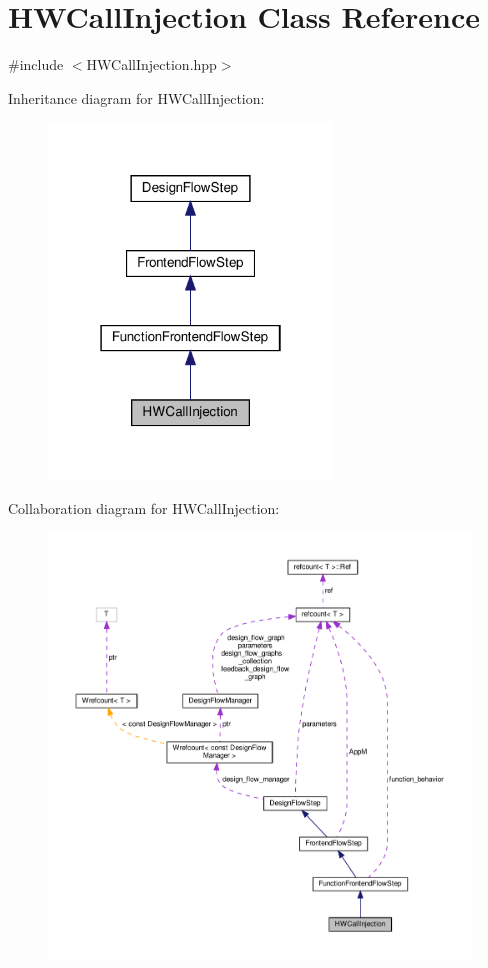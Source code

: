 \hypertarget{classHWCallInjection}{}\section{H\+W\+Call\+Injection Class Reference}
\label{classHWCallInjection}


{\ttfamily \#include $<$H\+W\+Call\+Injection.\+hpp$>$}



Inheritance diagram for H\+W\+Call\+Injection\+:
\nopagebreak
\begin{figure}[H]
\begin{center}
\leavevmode
\includegraphics[width=214pt]{db/d0e/classHWCallInjection__inherit__graph}
\end{center}
\end{figure}


Collaboration diagram for H\+W\+Call\+Injection\+:
\nopagebreak
\begin{figure}[H]
\begin{center}
\leavevmode
\includegraphics[width=350pt]{d2/dbc/classHWCallInjection__coll__graph}
\end{center}
\end{figure}
